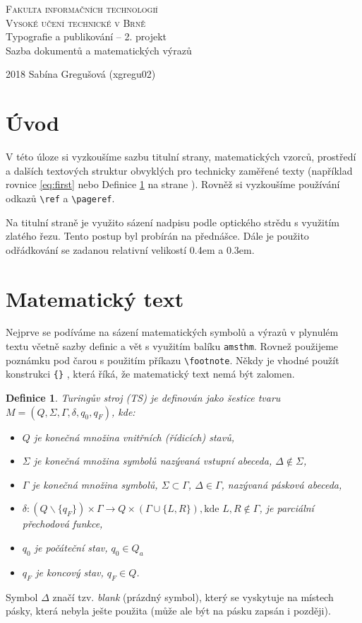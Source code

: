 \documentclass [11pt, a4paper]{article}
\newtheorem{definice}{Definice}
\begin{document}
\begin{center}
\Huge
\textsc{Fakulta informačních technologií\\
Vysoké učení technické v Brně}
\\[84mm]
\LARGE Typografie a publikování -- 2. projekt\\
Sazba dokumentů a matematických výrazů
\vfill
\end{center}
{\LARGE 2018 \hfill
Sabína Gregušová (xgregu02)}

\thispagestyle{empty}
\clearpage
\setcounter{page}{1}

\begin{twocolumn}
\section*{Úvod}
V této úloze si vyzkoušíme sazbu titulní strany, matematických
vzorců, prostředí a dalších textových struktur obvyklých
pro technicky zaměřené texty (například rovnice \eqref{eq:first}
nebo Definice \ref{def:def_1} na strane \pageref{def:def_1}). Rovněž si vyzkoušíme používání
odkazů \texttt{\textbackslash ref} a \texttt{\textbackslash pageref}.
\par Na titulní straně je využito sázení nadpisu podle optického
strědu s využitím zlatého řezu. Tento postup byl
probírán na přednášce. Dále je použito odřádkování se
zadanou relativní velikostí 0.4em a 0.3em.

\section{Matematický text}
Nejprve se podíváme na sázení matematických symbolů a výrazů v plynulém textu včetně sazby definic a vět s vy\-užitím
balíku \texttt{amsthm}. Rovnež použijeme poznámku pod
čarou s použitím příkazu \texttt{\textbackslash footnote}. Někdy je vhod\-né
použít konstrukci {\verb ${}$ }, která říká, že matematický text nemá být zalomen.
\begin{definice} \label{def:def_1}
\emph{Turingův stroj} (TS) je definován jako šestice
tvaru $M = (Q, \Sigma, \Gamma, \delta , q_0, q_F)$, kde:
\begin{itemize}
\item $Q$ je konečná množina \emph{vnitřních (řídicích) stavů},
\item $\Sigma$ je konečná množina symbolů nazývaná \emph{vstupní abeceda}, $\Delta\notin\Sigma$,
\item $\Gamma$ je konečná množina symbolů, $\Sigma\subset\Gamma$, $\Delta\in\Gamma$, nazývaná \emph{pásková abeceda},
\item $\delta:(Q\backslash\{q_F\})\times\Gamma\rightarrow Q\times(\Gamma\cup\{L,R\}),\text{kde }L,R\notin\Gamma$, je parciální \emph{přechodová funkce},
\item $q_0$ je \emph{počáteční stav}, $q_0\in Q_a$
\item $q_F$ je \emph{koncový stav}, $q_F\in Q$.
\end{itemize}
\end{definice}
Symbol $\Delta$ značí tzv. \emph{blank} (prázdný symbol), který se vyskytuje na místech pásky, která nebyla ješte použita (může ale být na pásku zapsán i později).


\end{twocolumn}
\end{document}
